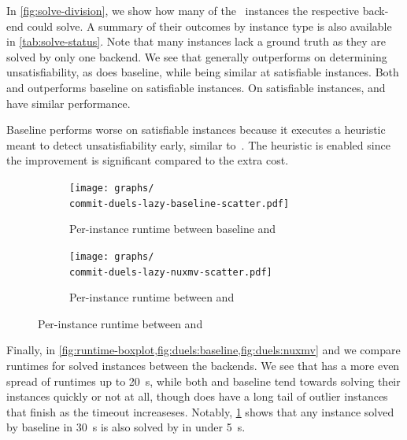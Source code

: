 In \cref{fig:solve-division}, we show how many of the~\NrBenchmarks{} instances
the respective back-end could solve. A summary of their outcomes by instance
type is also available in \cref{tab:solve-status}. Note that many instances lack
a ground truth as they are solved by only one backend. We see that
\Calculus{} generally outperforms \Nuxmv{} on determining unsatisfiability, as
does baseline, while being similar at satisfiable instances. Both \Calculus{} and
\Nuxmv{} outperforms baseline on satisfiable instances. On satisfiable
instances, \Nuxmv{} and \Calculus{} have similar performance.

Baseline performs worse on satisfiable instances because it executes a heuristic
meant to detect unsatisfiability early, similar to~\cite{approximate-parikh}.
The heuristic is enabled since the improvement is significant compared to the
extra cost.

\begin{figure}[t]
  \centering
  \begin{subfigure}[b]{0.49\textwidth}
    \texttt{[image: graphs/\\commit-duels-lazy-baseline-scatter.pdf]}
    \caption{Per-instance runtime between baseline and \Calculus{}}
    \label{fig:duels:baseline}
  \end{subfigure}
  \hfill
  \begin{subfigure}[b]{0.49\textwidth}
    \texttt{[image: graphs/\\commit-duels-lazy-nuxmv-scatter.pdf]}
    \caption{Per-instance runtime between \Nuxmv{} and \Calculus{}}
    \label{fig:duels:nuxmv}
  \end{subfigure}
\end{figure}


Finally, in \cref{fig:runtime-boxplot,fig:duels:baseline,fig:duels:nuxmv} and we compare
runtimes for solved instances between the backends. We see that \Nuxmv{} has a more even spread of runtimes up to \SI{20}{s},
while both \Calculus{} and baseline tend towards solving their
instances quickly or not at all, though \Calculus{} does have a long tail of outlier
instances that finish as the timeout increaseses.
Notably, \cref{fig:duels:baseline} shows that any instance solved by baseline in \SI{30}{s} is also
solved by \Calculus{} in under \SI{5}{s}.

